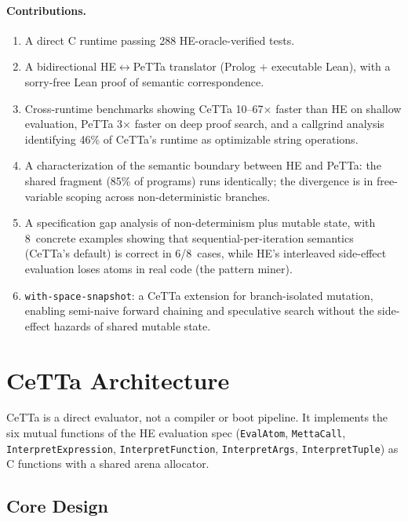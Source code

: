 \documentclass[11pt]{article}
\newcommand{\code}[1]{\texttt{#1}}
\newcommand{\PeTTa}{\textup{PeTTa}}
\newcommand{\HE}{\textup{HE}}
\newcommand{\CeTTa}{\textup{CeTTa}}
\begin{document}
\paragraph{Contributions.}
\begin{enumerate}
\item A direct C runtime passing 288 \HE{}-oracle-verified tests.
\item A bidirectional \HE{}$\leftrightarrow$\PeTTa{} translator
  (Prolog + executable Lean), with a sorry-free Lean proof of semantic
  correspondence.
\item Cross-runtime benchmarks showing \CeTTa{} 10--67$\times$ faster
  than \HE{} on shallow evaluation, \PeTTa{} 3$\times$ faster on deep
  proof search, and a callgrind analysis identifying 46\% of \CeTTa{}'s
  runtime as optimizable string operations.
\item A characterization of the semantic boundary between \HE{} and
  \PeTTa{}: the shared fragment (85\% of programs) runs identically; the
  divergence is in free-variable scoping across non-deterministic branches.
\item A specification gap analysis of non-determinism plus mutable state,
  with 8~concrete examples showing that sequential-per-iteration semantics
  (CeTTa's default) is correct in 6/8~cases, while \HE{}'s interleaved
  side-effect evaluation loses atoms in real code (the pattern miner).
\item \code{with-space-snapshot}: a CeTTa extension for branch-isolated
  mutation, enabling semi-naive forward chaining and speculative search
  without the side-effect hazards of shared mutable state.
\end{enumerate}

\section{\CeTTa{} Architecture}

\CeTTa{} is a direct evaluator, not a compiler or boot pipeline.  It
implements the six mutual functions of the \HE{} evaluation spec
(\code{EvalAtom}, \code{MettaCall}, \code{InterpretExpression},
\code{InterpretFunction}, \code{InterpretArgs}, \code{InterpretTuple})
as C functions with a shared arena allocator.

\subsection{Core Design}
\end{document}
